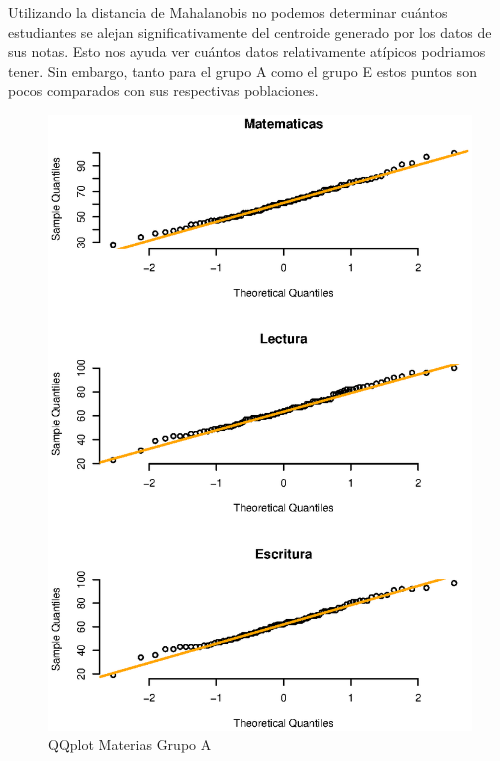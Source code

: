 \documentclass{article}
\begin{document}
    Utilizando la distancia de Mahalanobis no podemos determinar cu\'antos estudiantes se alejan significativamente
    del centroide generado por los datos de sus notas. Esto nos ayuda ver cu\'antos datos relativamente at\'ipicos 
    podriamos tener. Sin embargo, tanto para el grupo A como el grupo E estos puntos son pocos comparados con sus 
    respectivas poblaciones.



   \begin{figure}[H]
        \begin{minipage}[b]{0.45\linewidth}
            \includegraphics[scale = 0.4]{Output/Plots/qqA.eps}
            \vspace*{-6mm}
            \caption{QQplot Materias Grupo A}
            \label{fig:minipage1}
        \end{minipage}

\end{figure}
\end{document}
